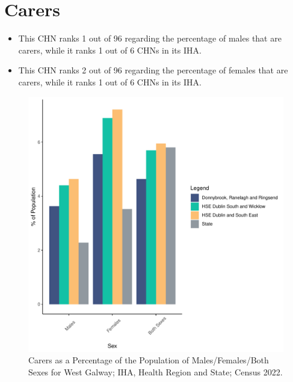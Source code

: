 \documentclass{article}
\begin{document}
\section{Carers}\label{sect:Carers}
\begin{itemize}
\item This CHN ranks  1 out of 96 regarding the percentage of males that are carers, while it ranks   1 out of 6 CHNs in its IHA.
\item This CHN ranks  2 out of 96 regarding the percentage of females that are carers, while it ranks   1 out of 6 CHNs in its IHA.
\end{itemize}
\begin{figure}[H]
	\centering
	\includegraphics[width = 150mm]{../figures/CareED.pdf}
	\caption{Carers as a Percentage of the Population of Males/Females/Both Sexes for West Galway; IHA, Health Region and State; Census 2022.}
	\label{fig:2ae19629-1a6a-13a3-e055-000000000001}
	\end{figure}
\end{document}

